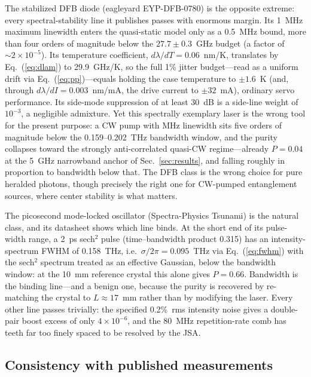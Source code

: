 The stabilized DFB diode (eagleyard EYP-DFB-0780) is the opposite
extreme: every spectral-stability line it publishes passes with
enormous margin. Its 1~MHz maximum linewidth enters the quasi-static
model only as a 0.5~MHz bound, more than four orders of magnitude
below the $27.7 \pm 0.3$~GHz budget (a factor of
$\sim 2\times 10^{-5}$). Its temperature coefficient,
$d\lambda/dT = 0.06$~nm/K, translates by Eq.~(\ref{eq:dlam}) to
29.9~GHz/K, so the full 1\% jitter budget---read as a uniform drift
via Eq.~(\ref{eq:pp})---equals holding the case temperature to
$\pm 1.6$~K (and, through $d\lambda/dI = 0.003$~nm/mA, the drive
current to $\pm 32$~mA), ordinary servo performance. Its side-mode
suppression of at least 30~dB is a side-line weight of $10^{-3}$, a
negligible admixture. Yet this spectrally exemplary laser is the
wrong tool for the present purpose: a CW pump with MHz linewidth sits
five orders of magnitude below the 0.159--0.202~THz bandwidth window,
and the purity collapses toward the strongly anti-correlated quasi-CW
regime---already $P = 0.04$ at the 5~GHz narrowband anchor of
Sec.~\ref{sec:results}, and falling roughly in proportion to
bandwidth below that. The DFB class
is the wrong choice for pure heralded photons, though precisely the
right one for CW-pumped entanglement sources, where center stability
is what matters.

The picosecond mode-locked oscillator (Spectra-Physics Tsunami) is
the natural class, and its datasheet shows which line binds. At the
short end of its pulse-width range, a 2~ps sech$^{2}$ pulse
(time--bandwidth product 0.315) has an intensity-spectrum FWHM of
0.158~THz, i.e.\ $\sigma/2\pi = 0.095$~THz via Eq.~(\ref{eq:fwhm})
with the sech$^{2}$ spectrum treated as an effective Gaussian,
below the bandwidth window: at the 10~mm reference crystal this alone
gives $P = 0.66$. Bandwidth is the binding line---and a benign one,
because the purity is recovered by re-matching the crystal to
$L \approx 17$~mm rather than by modifying the laser. Every other
line passes trivially: the specified 0.2\%~rms intensity noise gives
a double-pair boost excess of only $4\times 10^{-6}$, and the 80~MHz
repetition-rate comb has teeth far too finely spaced to be resolved
by the JSA.

\subsection*{Consistency with published measurements}

